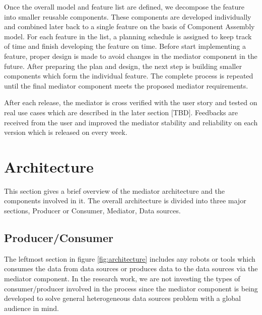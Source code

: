 	
	
	Once the overall model and feature list are defined, we decompose the feature into smaller reusable components. These components are developed individually and combined later back to a single feature on the basis of Component Assembly model. For each feature in the list, a planning schedule is assigned to keep track of time and finish developing the feature on time. Before start implementing a feature, proper design is made to avoid changes in the mediator component in the future. After preparing the plan and design, the next step is building smaller components which form the individual feature. The complete process is repeated until the final mediator component meets the proposed mediator requirements. 
	
	After each release, the mediator is cross verified with the user story and tested on real use cases which are described in the later section [TBD]. Feedbacks are received from the user and improved the mediator stability and reliability on each version which is released on every week.
	
	
	\section{Architecture} 
	This section gives a brief overview of the mediator architecture and the components involved in it.
	The overall architecture is divided into three major sections, Producer or Consumer, Mediator, Data sources.
	

	\subsection{Producer/Consumer}
	
	The leftmost section in figure \ref{fig:architecture} includes any robots or tools which consumes the data from data sources or produces data to the data sources via the mediator component. In the research work, we are not investing the types of consumer/producer involved in the process since the mediator component is being developed to solve general heterogeneous data sources problem with a global audience in mind.
	
	\newpage
	
